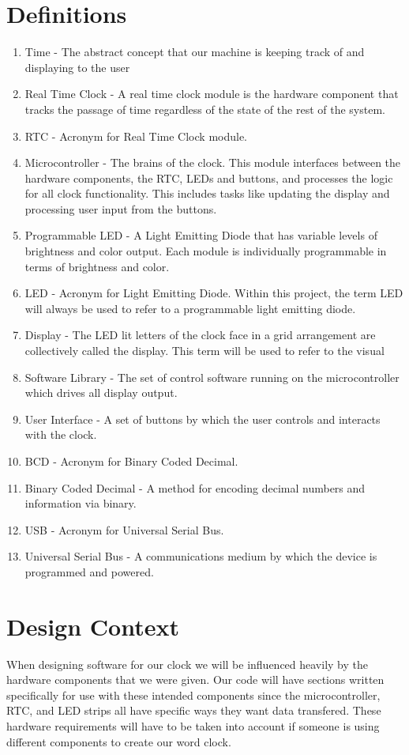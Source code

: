 \documentclass[10pt,draftclsnofoot,onecolumn]{IEEEtran}
\begin{document}
\section{Definitions}
\begin{enumerate}[]
  \item Time - The abstract concept that our machine is keeping track of and displaying to the user
  \item Real Time Clock - A real time clock module is the hardware component that tracks the passage
  of time regardless of the state of the rest of the system.
  \item RTC - Acronym for Real Time Clock module.
  \item Microcontroller - The brains of the clock. This module interfaces between the hardware
  components, the RTC, LEDs and buttons, and processes the logic for all clock functionality.
  This includes tasks like updating the display and processing user input from the buttons.
  \item Programmable LED - A Light Emitting Diode that has variable levels of brightness and
  color output. Each module is individually programmable in terms of brightness and color.
  \item LED - Acronym for Light Emitting Diode. Within this project, the term LED will always
  be used to refer to a programmable light emitting diode.
  \item Display - The LED lit letters of the clock face in a grid arrangement are collectively
  called the display. This term will be used to refer to the visual
  \item Software Library - The set of control software running on the microcontroller which drives all display output.
  \item User Interface - A set of buttons by which the user controls and interacts with the clock.
  \item BCD - Acronym for Binary Coded Decimal.
  \item Binary Coded Decimal - A method for encoding decimal numbers and information via binary.
  \item USB - Acronym for Universal Serial Bus.
  \item Universal Serial Bus - A communications medium by which the device is programmed and  powered.
\end{enumerate}

\newpage

\section{Design Context}
When designing software for our clock we will be influenced heavily by the hardware components that we were given.
Our code will have sections written specifically for use with these intended components since the microcontroller, RTC, and LED strips all have specific ways they want data transfered.
These hardware requirements will have to be taken into account if someone is using different components to create our word clock.
\end{document}
